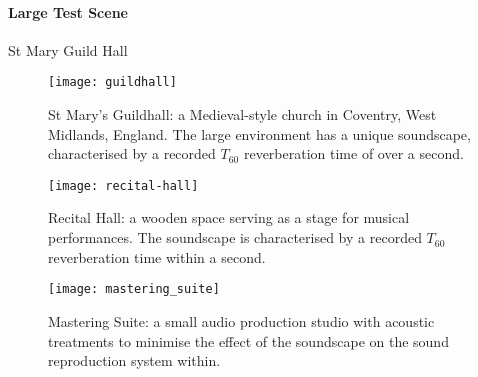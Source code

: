 \paragraph{Large Test Scene}
St Mary Guild Hall

\begin{figure}[htbp]
    \centering
    \texttt{[image: guildhall]}
    \caption[Proof of concept demonstration --- large environment]{St Mary's Guildhall: a Medieval-style church in Coventry, West Midlands, England. The large environment has a unique soundscape, characterised by a recorded $T_{60}$ reverberation time of over a second.}
    \label{fig:guildhall-iso-render}
\end{figure}

\begin{figure}[htbp]
    \centering
    \texttt{[image: recital-hall]}
    \caption[Proof of concept demonstration --- medium environment]{Recital Hall: a wooden space serving as a stage for musical performances. The soundscape is characterised by a recorded $T_{60}$ reverberation time within a second.}
    \label{fig:conservatoire-iso-render}
\end{figure}

\begin{figure}[htbp]
    \centering
    \texttt{[image: mastering\_suite]}
    \caption[Proof of concept demonstration --- small environment]{Mastering Suite: a small audio production studio with acoustic treatments to minimise the effect of the soundscape on the sound reproduction system within.}
    \label{fig:mastering-iso-render}
\end{figure}


